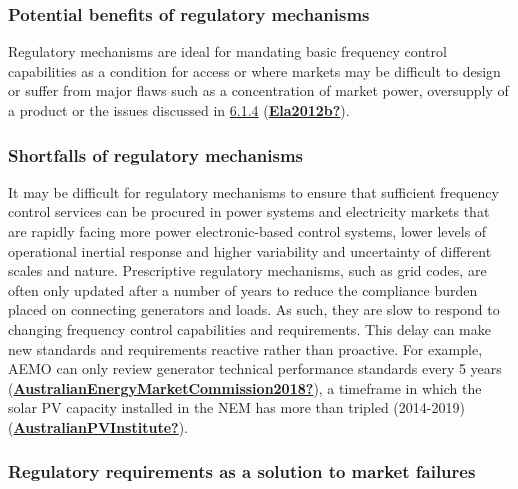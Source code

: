 \documentclass[12pt,a4paper,]{report}
\begin{document}
\hypertarget{potential-benefits-of-regulatory-mechanisms}{%
\subsubsection{Potential benefits of regulatory
mechanisms}\label{potential-benefits-of-regulatory-mechanisms}}

Regulatory mechanisms are ideal for mandating basic frequency control
capabilities as a condition for access or where markets may be difficult
to design or suffer from major flaws such as a concentration of market
power, oversupply of a product or the issues discussed in
\protect\hyperlink{sec:challgnes_fcas_markets}{6.1.4}
(\protect\hyperlink{ref-Ela2012b}{\textbf{Ela2012b?}}).

\hypertarget{shortfalls-of-regulatory-mechanisms}{%
\subsubsection{Shortfalls of regulatory
mechanisms}\label{shortfalls-of-regulatory-mechanisms}}

It may be difficult for regulatory mechanisms to ensure that sufficient
frequency control services can be procured in power systems and
electricity markets that are rapidly facing more power electronic-based
control systems, lower levels of operational inertial response and
higher variability and uncertainty of different scales and nature.
Prescriptive regulatory mechanisms, such as grid codes, are often only
updated after a number of years to reduce the compliance burden placed
on connecting generators and loads. As such, they are slow to respond to
changing frequency control capabilities and requirements. This delay can
make new standards and requirements reactive rather than proactive. For
example, AEMO can only review generator technical performance standards
every 5 years
(\protect\hyperlink{ref-AustralianEnergyMarketCommission2018}{\textbf{AustralianEnergyMarketCommission2018?}}),
a timeframe in which the solar PV capacity installed in the NEM has more
than tripled (2014-2019)
(\protect\hyperlink{ref-AustralianPVInstitute}{\textbf{AustralianPVInstitute?}}).

\hypertarget{regulatory-requirements-as-a-solution-to-market-failures}{%
\subsubsection{Regulatory requirements as a solution to market
failures}\label{regulatory-requirements-as-a-solution-to-market-failures}}
\end{document}

